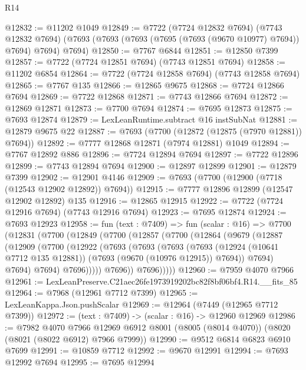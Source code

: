 \begin{lexlean}{R14}
\begin{coremodule}
@12832 := @11202 @1049
@12849 := @7722
    (@7724 @12832 @7694)
    (@7743 @12832 @7694)
    (@7693 (@7693 (@7693 (@7695 (@7693 (@9670 @10977) @7694)) @7694) @7694) @7694)
@12850 := @7767 @6844
@12851 := @12850 @7399
@12857 := @7722 (@7724 @12851 @7694) (@7743 @12851 @7694)
@12858 := @11202 @6854
@12864 := @7722 (@7724 @12858 @7694) (@7743 @12858 @7694)
@12865 := @7767 @135
@12866 := @12865 @9675
@12868 := @7724 @12866 @7694
@12869 := @7722 @12868
@12871 := @7743 @12866 @7694
@12872 := @12869 @12871
@12873 := @7700 @7694
@12874 := @7695 @12873
@12875 := @7693 @12874
@12879 := LexLeanRuntime.subtract @16 instSubNat
@12881 := @12879 @9675 @22
@12887 := @7693 (@7700 (@12872 (@12875 (@7970 @12881)) @7694))
@12892 := @7777 @12868 @12871 (@7974 @12881) @1049
@12894 := @7767 @12892 @886
@12896 := @7724 @12894 @7694
@12897 := @7722 @12896
@12899 := @7743 @12894 @7694
@12900 := @12897 @12899
@12901 := @12879 @7399
@12902 := @12901 @4146
@12909 := @7693 (@7700 (@12900 (@7718 (@12543 @12902 @12892)) @7694))
@12915 := @7777 @12896 @12899 (@12547 @12902 @12892) @135
@12916 := @12865 @12915
@12922 := @7722 (@7724 @12916 @7694) (@7743 @12916 @7694)
@12923 := @7695 @12874
@12924 := @7693 @12923
@12958 := fun (text : @7409) =>
  fun (scalar : @16) =>
  @7700
    (@12831
      (@7700
        (@12849
          (@7700
            (@12857
              (@7700
                (@12864
                  (@9679
                    (@12887
                      (@12909
                        (@7700
                          (@12922
                            (@7693
                              (@7693
                                (@7693
                                  (@7693
                                    (@12924 (@10641 @7712 @135 @12881))
                                    (@7693 (@9670 (@10976 @12915)) @7694))
                                  @7694)
                                @7694)
                              @7694)
                            @7696)))))
                  @7696))
              @7696)))))
@12960 := @7959 @4070 @7966
@12961 := LexLeanPreserve.C21aec26fe1973919202bc82f8bf06bf4.R14.__fits_85
@12964 := @7968 (@12961 @7712 @7399)
@12965 := LexLeanKappa.Json.pushScalar
@12969 := @12964 (@7449 (@12965 @7712 @7399))
@12972 := (text : @7409) -> (scalar : @16) -> @12960 @12969
@12986 := @7982
    @4070
    @7966
    @12969
    @6912
    @8001
    (@8005 (@8014 @4070))
    (@8020 (@8021 (@8022 @6912) @7966 @7999))
@12990 := @9512 @6814 @6823 @6910 @7699
@12991 := @10859 @7712
@12992 := @9670 @12991
@12994 := @7693 @12992 @7694
@12995 := @7695 @12994

\end{coremodule}
\end{lexlean}
